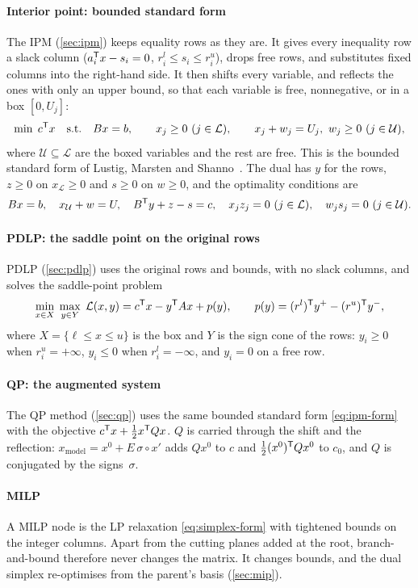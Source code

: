 \paragraph{Interior point: bounded standard form}
The IPM (\cref{sec:ipm}) keeps equality rows as they are. It gives every inequality row a slack
column ($a_i^{\mathsf{T}} x - s_i = 0$, $r^l_i\le s_i\le r^u_i$), drops free rows, and substitutes fixed
columns into the right-hand side. It then shifts every variable, and reflects the ones with only
an upper bound, so that each variable is free, nonnegative, or in a box $[0,U_j]$:
\begin{equation}\label{eq:ipm-form}
  \min\; c\T x\quad\text{s.t.}\quad Bx = b,\qquad x_j\ge0\ (j\in\mathcal{L}),\qquad
  x_j + w_j = U_j,\ w_j\ge0\ (j\in\mathcal{U}),
\end{equation}
where $\mathcal{U}\subseteq\mathcal{L}$ are the boxed variables and the rest are free. This is the
bounded standard form of Lustig, Marsten and Shanno~\cite{lustig1994}. The dual has $y$ for the
rows, $z\ge0$ on $x_{\mathcal{L}}\ge0$ and $s\ge0$ on $w\ge0$, and the optimality conditions are
\begin{equation}\label{eq:ipm-kkt}
  Bx=b,\quad x_{\mathcal U}+w=U,\quad B^{\mathsf{T}} y + z - s = c,\quad
  x_j z_j = 0\ (j\in\mathcal L),\quad w_j s_j = 0\ (j\in\mathcal U).
\end{equation}

\paragraph{PDLP: the saddle point on the original rows}
PDLP (\cref{sec:pdlp}) uses the original rows and bounds, with no slack columns, and solves the
saddle-point problem
\begin{equation}\label{eq:saddle}
  \min_{x\in X}\;\max_{y\in Y}\; \mathcal{L}(x,y)= c^{\mathsf{T}} x - y^{\mathsf{T}} A x + p(y),\qquad
  p(y) = (r^l)^{\mathsf{T}} y^+ - (r^u)^{\mathsf{T}} y^-,
\end{equation}
where $X=\{\ell\le x\le u\}$ is the box and $Y$ is the sign cone of the rows: $y_i\ge0$ when
$r^u_i=+\infty$, $y_i\le0$ when $r^l_i=-\infty$, and $y_i=0$ on a free row.

\paragraph{QP: the augmented system}
The QP method (\cref{sec:qp}) uses the same bounded standard form \eqref{eq:ipm-form} with the
objective $c^{\mathsf{T}} x+\frac12 x^{\mathsf{T}} Qx$. $Q$ is carried through the shift and the reflection:
$x_{\text{model}} = x^0 + E\,\sigma\circ x'$ adds $Qx^0$ to $c$ and $\frac12 (x^0)^{\mathsf{T}} Q x^0$ to
$c_0$, and $Q$ is conjugated by the signs~$\sigma$.

\paragraph{MILP}
A MILP node is the LP relaxation \eqref{eq:simplex-form} with tightened bounds on the integer
columns. Apart from the cutting planes added at the root, branch-and-bound therefore never changes
the matrix. It changes bounds, and the dual
simplex re-optimises from the parent's basis (\cref{sec:mip}).
